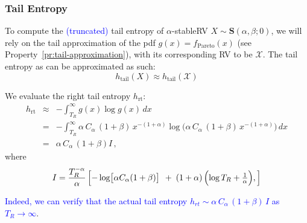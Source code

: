 \documentclass{article}
\theoremstyle{definition}
\begin{document}
\subsubsection{Tail Entropy}
To compute the \textcolor{blue}{(truncated)} tail entropy of \(\alpha\)-stableRV \(X\sim\mathbf{S}(\alpha,\beta;0)\), we will rely on the tail approximation of the pdf \(g{(x)=f_\mathrm{Pareto}(x)}\) (see Property~\ref{pr:tail-approximation}), with its corresponding RV to be \(\mathcal{X}\). The tail entropy as can be approximated as such:
\[
      h_{\mathrm{tail}}(X)
      \approx h_\mathrm{tail}(\mathcal{X})
\]

We evaluate the right tail entropy \(h_\mathrm{rt}\):
\begin{eqnarray}
h_{\mathrm{rt}}
&\approx& -\int_{T_R}^{\infty}
g(x)\log g(x)\,dx\\
&=& -\int_{T_R}^{\infty}
\alpha\,C_\alpha\,(1+\beta)\,x^{-(1+\alpha)}
\log\bigl(\alpha\,C_\alpha\,(1+\beta)\,x^{-(1+\alpha)}\bigr)\,dx \\
&=& \alpha\,C_\alpha\,(1+\beta)I\,,
\end{eqnarray}
where 
\[
I
= \frac{T_R^{-\alpha}}{\alpha} \left[-\log\bigl[\alpha C_\alpha(1+\beta)\bigr]\,
\;+\;(1+\alpha)\,
\Bigl(\log T_R + \tfrac{1}{\alpha}\Bigr),
\right]\]

\textcolor{blue}{Indeed, we can verify that the actual tail entropy \(h_{rt} \sim \alpha\,C_\alpha\,(1+\beta)\,I \) as \(T_R\to\infty\)}.
\end{document}
